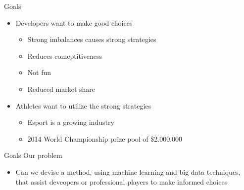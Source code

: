 \begin{frame}{Goals}
	\begin{itemize}
		\item Developers want to make good choices
			\begin{itemize}
			\item Strong imbalances causes strong strategies
			\item Reduces comeptitiveness
			\item Not fun
			\item Reduced market share 
			\end{itemize}
		
	\end{itemize}

	\begin{itemize}
		\item Athletes want to utilize the strong strategies
		\begin{itemize}
			\item Esport is a growing industry
			\item 2014 World Championship prize pool of \$2.000.000
		\end{itemize}
	\end{itemize}
	
\end{frame}

\begin{frame}{Goals}
	Our problem
	\begin{itemize}
			\item Can we devise a method, using machine learning and big data techniques, that assist deveopers or professional players to make informed choices
	\end{itemize}
\end{frame}